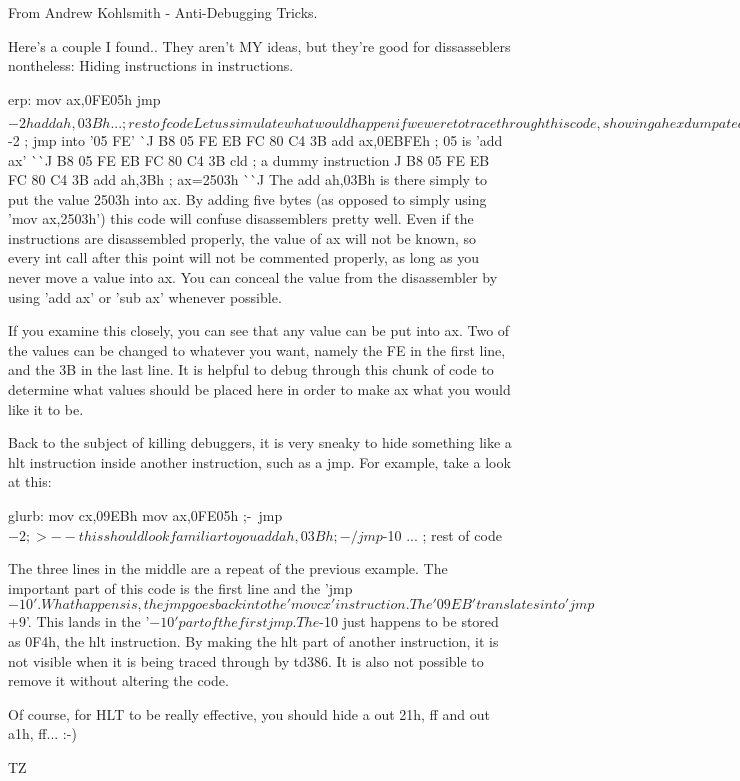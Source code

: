 From Andrew Kohlsmith  -  Anti-Debugging Tricks.

Here's a couple I found..  They aren't MY ideas, but they're good for
dissasseblers nontheless:  Hiding instructions in instructions.

erp:    mov     ax,0FE05h
        jmp     $-2h
        add     ah,03Bh
        ...                     ; rest of code

Let us simulate what would happen if we were to trace through this code,
showing a hex dump at each step to clarify things.

 B8 05 FE EB FC 80 C4 3B   mov     ax,0FE05h       ; ax=FE05h
 ^^ ^^ ^^
 B8 05 FE EB FC 80 C4 3B   jmp     $-2             ; jmp into '05 FE'
          ^^ ^^
 B8 05 FE EB FC 80 C4 3B   add     ax,0EBFEh       ; 05 is 'add ax'
    ^^ ^^ ^^
 B8 05 FE EB FC 80 C4 3B   cld                     ; a dummy instruction
             ^^
 B8 05 FE EB FC 80 C4 3B   add     ah,3Bh          ; ax=2503h
                ^^ ^^ ^^

     The add ah,03Bh is there simply to put the value 2503h into ax.  By adding
five bytes (as opposed to simply using 'mov ax,2503h') this code will confuse
disassemblers pretty well.  Even if the instructions are disassembled properly,
the value of ax will not be known, so every int call after this point will not
be commented properly, as long as you never move a value into ax.  You can
conceal the value from the disassembler by using 'add ax' or 'sub ax' whenever
possible.

     If you examine this closely, you can see that any value can be put into
ax.  Two of the values can be changed to whatever you want, namely the FE in
the first line, and the 3B in the last line.  It is helpful to debug through
this chunk of code to determine what values should be placed here in order to
make ax what you would like it to be.

     Back to the subject of killing debuggers, it is very sneaky to hide
something like a hlt instruction inside another instruction, such as a jmp.
For example, take a look at this:

glurb:  mov     cx,09EBh
        mov     ax,0FE05h ;-\
        jmp     $-2       ;  >--this should look familiar to you
        add     ah,03Bh   ;-/
        jmp     $-10
        ...             ; rest of code

The three lines in the middle are a repeat of the previous example.  The
important part of this code is the first line and the 'jmp $-10'.  What happens
is, the jmp goes back into the 'mov cx' instruction.  The '09EB' translates
into 'jmp $+9'.  This lands in the '$-10' part of the first jmp.  The $-10 just
happens to be stored as 0F4h, the hlt instruction.  By making the hlt part of
another instruction, it is not visible when it is being traced through by
td386.  It is also not possible to remove it without altering the code.

Of course, for HLT to be really effective, you should hide a out 21h, ff and
out a1h, ff...  :-)

TZ


